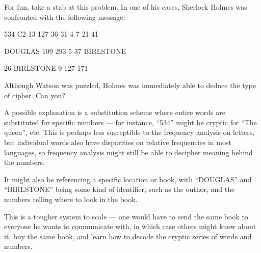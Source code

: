 \begin{problem}
For fun, take a stab at this problem.  In one of his cases, Sherlock Holmes was confronted with the following message:

\begin{center}
534 C2 13 127 36 31 4 7 21 41

DOUGLAS 109 293 5 37 BIRLSTONE

26 BIRLSTONE 9 127 171
\end{center}
Although Watson was puzzled, Holmes was immediately able to deduce the type of cipher.  Can you?
\begin{Answer}
A possible explanation is a substitution scheme where entire words
are substituted for specific numbers --- for instance,
``534'' might be cryptic for ``The queen'', etc.
This is perhaps less susceptible to the frequency analysis on letters,
but individual words also have disparities on relative frequencies in most
languages, so frequency analysis might still be able to decipher meaning
behind the numbers.

\noindent
It might also be referencing a specific location or book, with ``DOUGLAS'' and ``BIRLSTONE''
being some kind of identifier, such as the outhor, and the numbers telling where to look in the book.

\noindent
This is a tougher system to scale --- one would have to send the same book to everyone he wants to 
communicate with, in which case others might know about it, buy the same book, and learn how to
 decode the cryptic series of words and numbers.

\end{Answer}
\end{problem}
